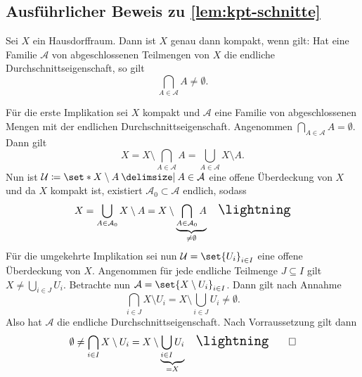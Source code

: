 
\subsection{Ausführlicher Beweis zu \cref{lem:kpt-schnitte}} %
\label{sub:kpt-schnitte}
Sei $X$ ein Hausdorffraum. Dann ist $X$ genau dann kompakt, wenn gilt: Hat eine Familie $\mathcal{A}$ von abgeschlossenen Teilmengen von $X$ die endliche 
Durchschnittseigenschaft, so gilt 
\[
	\bigcap_{A \in \mathcal{A}} A \not= \emptyset.
\]
\begin{beweis}
	Für die erste Implikation sei $X$ kompakt und $\mathcal{A}$ eine Familie von abgeschlossenen Mengen mit der endlichen Durchschnittseigenschaft.
	Angenommen $\bigcap_{A \in \mathcal{A}} A = \emptyset$.
	Dann gilt
	\[
		X = X \setminus \bigcap_{A \in \mathcal{A}} A = \bigcup_{A \in \mathcal{A}} X \setminus A.
	\]
	Nun ist $\mathcal{U} \coloneqq \set*{X \setminus A \given A \in \mathcal{A}}$ eine offene Überdeckung von $X$ und da $X$ kompakt ist, existiert $\mathcal{A}_0 \subset \mathcal{A}$ endlich, sodass
	\[
		X = \bigcup_{A \in \mathcal{A}_0} X \setminus A = X \setminus \underbrace{\bigcap_{A \in \mathcal{A}_0 } A }_{\neq \emptyset} \quad \light
	\]
	Für die umgekehrte Implikation sei nun $\mathcal{U} = \set{U_i}_{i \in I}$ eine offene Überdeckung von $X$.
	Angenommen für jede endliche Teilmenge $J \subseteq I$ gilt $X \neq \bigcup_{i \in J} U_i$.
	Betrachte nun $\mathcal{A} =  \set{X \setminus U_i}_{i \in I}$. Dann gilt nach Annahme
	\[
		\bigcap_{i \in J} X \setminus U_i = X \setminus \bigcup_{i \in J} U_i \neq \emptyset.
	\]
	Also hat $\mathcal{A}$ die endliche Durchschnittseigenschaft. Nach Vorraussetzung gilt dann
	\[
		\emptyset \not= \bigcap_{i \in I} X \setminus U_i = X \setminus \underbrace{\bigcup_{i \in I} U_i}_{= X} \quad \light \qedhere
	\]
\end{beweis}

